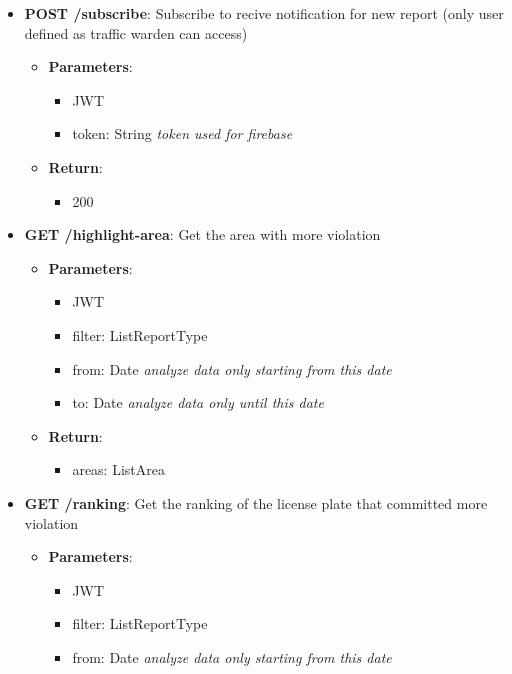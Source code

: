 \documentclass{article}
\begin{document}
\begin{itemize}
\begin{itemize}
\begin{itemize}
				\end{itemize}
			\item \textbf{POST /subscribe}:
				Subscribe to recive notification for new report (only user defined as traffic warden can access)
				\begin{itemize}
					\item \textbf{Parameters}:
						\begin{itemize}
							\item JWT
							\item token: String \textit{token used for firebase}
						\end{itemize}
					\item \textbf{Return}:
						\begin{itemize}
							\item 200
						\end{itemize}
				\end{itemize}
			\item \textbf{GET /highlight-area}:
				Get the area with more violation
				\begin{itemize}
					\item \textbf{Parameters}:
						\begin{itemize}
							\item JWT
							\item filter: List\textlangle{}ReportType\textrangle{}
							\item from: Date \textit{analyze data only starting from this date}
							\item to: Date \textit{analyze data only until this date}
						\end{itemize}
					\item \textbf{Return}:
						\begin{itemize}
							\item areas: List\textlangle{}Area\textrangle{}
						\end{itemize}
				\end{itemize}
			\item \textbf{GET /ranking}:
				Get the ranking of the license plate that committed more violation
				\begin{itemize}
					\item \textbf{Parameters}:
						\begin{itemize}
							\item JWT
							\item filter: List\textlangle{}ReportType\textrangle{}
							\item from: Date \textit{analyze data only starting from this date}

\end{itemize}
\end{itemize}
\end{itemize}
\end{itemize}
\end{document}
